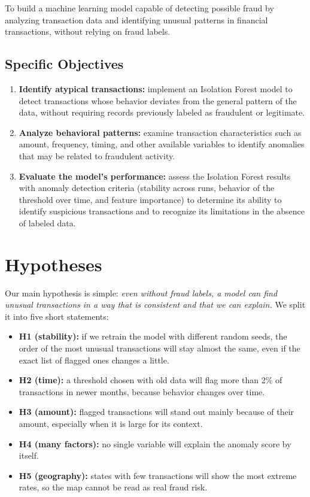 \documentclass[journal]{IEEEtran}
\begin{document}
To build a machine learning model capable of detecting possible fraud by analyzing transaction data and identifying unusual patterns in financial transactions, without relying on fraud labels.

\subsection{Specific Objectives}

\begin{enumerate}
    \item \textbf{Identify atypical transactions:} implement an Isolation Forest model to detect transactions whose behavior deviates from the general pattern of the data, without requiring records previously labeled as fraudulent or legitimate.
    \item \textbf{Analyze behavioral patterns:} examine transaction characteristics such as amount, frequency, timing, and other available variables to identify anomalies that may be related to fraudulent activity.
    \item \textbf{Evaluate the model's performance:} assess the Isolation Forest results with anomaly detection criteria (stability across runs, behavior of the threshold over time, and feature importance) to determine its ability to identify suspicious transactions and to recognize its limitations in the absence of labeled data.
\end{enumerate}


\section{Hypotheses}

Our main hypothesis is simple: \emph{even without fraud labels, a model can find unusual transactions in a way that is consistent and that we can explain.} We split it into five short statements:

\begin{itemize}
    \item \textbf{H1 (stability):} if we retrain the model with different random seeds, the order of the most unusual transactions will stay almost the same, even if the exact list of flagged ones changes a little.
    \item \textbf{H2 (time):} a threshold chosen with old data will flag more than 2\% of transactions in newer months, because behavior changes over time.
    \item \textbf{H3 (amount):} flagged transactions will stand out mainly because of their amount, especially when it is large for its context.
    \item \textbf{H4 (many factors):} no single variable will explain the anomaly score by itself.
    \item \textbf{H5 (geography):} states with few transactions will show the most extreme rates, so the map cannot be read as real fraud risk.
\end{itemize}
\end{document}
